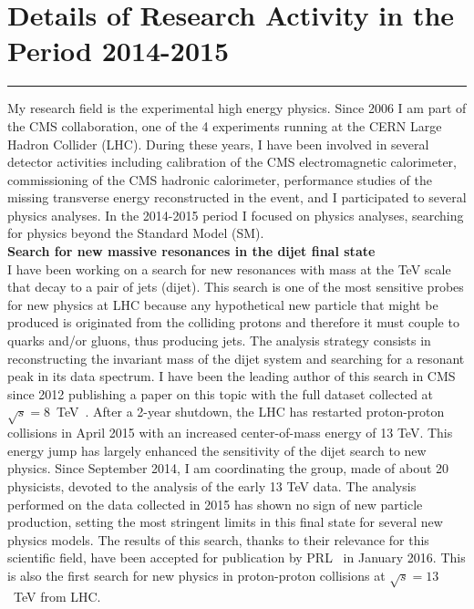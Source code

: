 \documentclass[10pt, a4paper]{article}
\begin{document}
\section*{Details of Research Activity in the Period 2014-2015}
\vspace{-5pt}
\hrule
\vspace{10pt}
My research field is the experimental high energy physics. Since 2006
I am part of the CMS collaboration, one of the 4 experiments running at
the CERN Large Hadron Collider (LHC). During these years, I have been
involved in several detector activities including calibration of the
CMS electromagnetic calorimeter, commissioning of the CMS hadronic
calorimeter, performance studies of the missing transverse energy
reconstructed in the event, and I participated to several physics analyses.
In the 2014-2015 period I focused on physics analyses, searching for 
physics beyond the Standard Model (SM). \\[1em]

{\bf Search for new massive resonances in the dijet final state}\\[0.5em]
I have been working on a search for new resonances with mass at the TeV
scale that decay to a pair of jets (dijet). This search is one of the most 
sensitive probes for new physics at LHC because any hypothetical new
particle that might be produced is originated from the
colliding protons and therefore it must couple to quarks and/or
gluons, thus producing jets. The analysis strategy consists in
reconstructing the invariant mass of the dijet system and searching for a
resonant peak in its data spectrum. I have been the leading author of this
search in CMS since 2012 publishing a paper on this topic with the
full dataset collected at $\sqrt{s}=8$~TeV~\cite{Khachatryan:2015sja}. After a 2-year
shutdown, the LHC has restarted proton-proton collisions in April 2015 with an increased 
center-of-mass energy of 13 TeV. This energy jump has largely enhanced the
sensitivity of the dijet search to new physics. Since September 2014, I
am coordinating the group, made of about 20 physicists, devoted to the
analysis of the early 13 TeV data. The analysis performed on the data
collected in 2015 has shown no sign of new particle
production, setting the most stringent limits in this final state for several new physics
models. The results of this search, thanks to their
relevance for this scientific 
field, have been accepted for publication by
PRL~\cite{Khachatryan:2015dcf} in January 2016. 
This is also the first search for new physics in proton-proton
collisions at $\sqrt{s}=13$~TeV from LHC. \\[1em]
\end{document}
